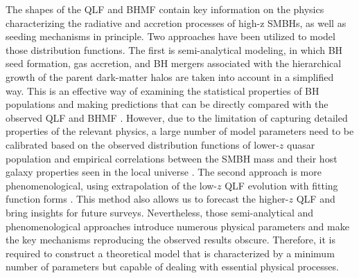 \documentclass[twocolumn, twocolappendix]{aastex63}
\begin{document}
\begin{CJK*}{UTF8}{gbsn}
The shapes of the QLF and BHMF contain key information on the physics characterizing the radiative 
and accretion processes of high-z SMBHs, as well as seeding mechanisms in principle.
Two approaches have been utilized to model those distribution functions.  
The first is semi-analytical modeling, in which BH seed formation, gas accretion, and BH mergers associated 
with the hierarchical growth of the parent dark-matter halos are taken into account in a simplified way. 
This is an effective way of examining the statistical properties of BH populations and making predictions 
that can be directly compared with the observed QLF and BHMF
\citep[e.g.,][]{1998ApJ...503..505H,2010ApJ...718..231S,2018MNRAS.474.1995R,2018MNRAS.481.3278R,
2021MNRAS.508.2706Y,2021ApJ...910L..11K,2022MNRAS.511..616T}. 
However, due to the limitation of capturing detailed properties of the relevant physics, 
a large number of model parameters need to be calibrated based on the observed distribution functions 
of lower-$z$ quasar population \citep[e.g.,][]{2007ApJ...669...45H}
and empirical correlations between the SMBH mass and their host galaxy properties seen
in the local universe \citep{2013ARA&A..51..511K}.
The second approach is more phenomenological, using extrapolation of the low-$z$ QLF evolution with 
fitting function forms \citep[e.g.,][]{2019MNRAS.488.1035K,2020MNRAS.495.3252S,2022arXiv220702233F}.
This method also allows us to forecast the higher-$z$ QLF and bring insights for future surveys.
Nevertheless, those semi-analytical and phenomenological approaches introduce numerous physical parameters
and make the key mechanisms reproducing the observed results obscure.
Therefore, it is required to construct a theoretical model that is characterized by a minimum number of parameters
but capable of dealing with essential physical processes.



\end{CJK*}
\end{document}
